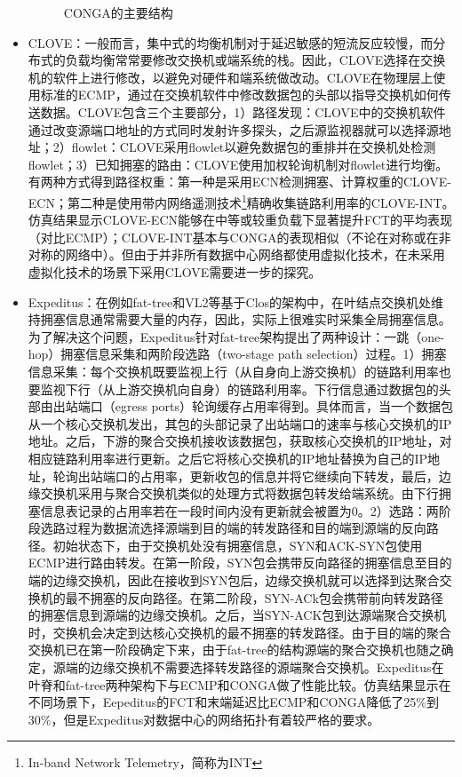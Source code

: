 \begin{itemize}
\begin{figure}[htb!]
\begin{subfigure}{0.45\textwidth}
\end{subfigure}%
\caption{CONGA的主要结构}
\end{figure}
    \item CLOVE\cite{katta2016CLOVE}：一般而言，集中式的均衡机制对于延迟敏感的短流反应较慢，而分布式的负载均衡常常要修改交换机或端系统的栈。因此，CLOVE选择在交换机的软件上进行修改，以避免对硬件和端系统做改动。CLOVE在物理层上使用标准的ECMP，通过在交换机软件中修改数据包的头部以指导交换机如何传送数据。CLOVE包含三个主要部分，1）路径发现：CLOVE中的交换机软件通过改变源端口地址的方式同时发射许多探头，之后源监视器就可以选择源地址；2）flowlet：CLOVE采用flowlet以避免数据包的重排并在交换机处检测flowlet；3）已知拥塞的路由：CLOVE使用加权轮询机制对flowlet进行均衡。有两种方式得到路径权重：第一种是采用ECN检测拥塞、计算权重的CLOVE-ECN；第二种是使用带内网络遥测技术\footnote{In-band Network Telemetry，简称为INT}精确收集链路利用率的CLOVE-INT。仿真结果显示CLOVE-ECN能够在中等或较重负载下显著提升FCT的平均表现（对比ECMP）；CLOVE-INT基本与CONGA的表现相似（不论在对称或在非对称的网络中）。但由于并非所有数据中心网络都使用虚拟化技术，在未采用虚拟化技术的场景下采用CLOVE需要进一步的探究。
    \item Expeditus\cite{wang2014Expeditus}：在例如fat-tree\cite{alfares2008fattree}和VL2\cite{greenberg2009vl2}等基于Clos的架构中，在叶结点交换机处维持拥塞信息通常需要大量的内存，因此，实际上很难实时采集全局拥塞信息。为了解决这个问题，Expeditus针对fat-tree架构提出了两种设计：一跳（one-hop）拥塞信息采集和两阶段选路（two-stage path selection）过程。1）拥塞信息采集：每个交换机既要监视上行（从自身向上游交换机）的链路利用率也要监视下行（从上游交换机向自身）的链路利用率。下行信息通过数据包的头部由出站端口（egress ports）轮询缓存占用率得到。具体而言，当一个数据包从一个核心交换机发出，其包的头部记录了出站端口的速率与核心交换机的IP地址。之后，下游的聚合交换机接收该数据包，获取核心交换机的IP地址，对相应链路利用率进行更新。之后它将核心交换机的IP地址替换为自己的IP地址，轮询出站端口的占用率，更新收包的信息并将它继续向下转发，最后，边缘交换机采用与聚合交换机类似的处理方式将数据包转发给端系统。由下行拥塞信息表记录的占用率若在一段时间内没有更新就会被置为0。2）选路：两阶段选路过程为数据流选择源端到目的端的转发路径和目的端到源端的反向路径。初始状态下，由于交换机处没有拥塞信息，SYN和ACK-SYN包使用ECMP进行路由转发。在第一阶段，SYN包会携带反向路径的拥塞信息至目的端的边缘交换机，因此在接收到SYN包后，边缘交换机就可以选择到达聚合交换机的最不拥塞的反向路径。在第二阶段，SYN-ACk包会携带前向转发路径的拥塞信息到源端的边缘交换机。之后，当SYN-ACK包到达源端聚合交换机时，交换机会决定到达核心交换机的最不拥塞的转发路径。由于目的端的聚合交换机已在第一阶段确定下来，由于fat-tree的结构源端的聚合交换机也随之确定，源端的边缘交换机不需要选择转发路径的源端聚合交换机。Expeditus在叶脊和fat-tree两种架构下与ECMP和CONGA做了性能比较。仿真结果显示在不同场景下，Eepeditus的FCT和末端延迟比ECMP和CONGA降低了25\%到30\%，但是Expeditus对数据中心的网络拓扑有着较严格的要求。

\end{itemize}
